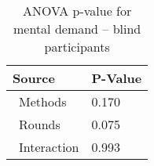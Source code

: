 
\begin{table}[!htb]
\centering
\caption{ANOVA p-value for mental demand -- blind participants}
\label{tab:blocanova_md_avg_two_way_blind}
\begin{tabular}{ll}
\toprule
          Source & P-Value \\
\midrule
    \    Methods &   0.170 \\
     \    Rounds &   0.075 \\
\    Interaction &   0.993 \\
\bottomrule
\end{tabular}
\end{table}

